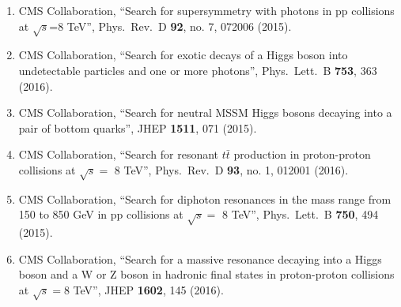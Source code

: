 \begin{enumerate}
\item CMS Collaboration, ``Search for supersymmetry with photons in pp collisions at $\sqrt{s}$=8 TeV'', Phys.\ Rev.\ D {\bf 92}, no. 7, 072006 (2015).

\item CMS Collaboration, ``Search for exotic decays of a Higgs boson into undetectable particles and one or more photons'', Phys.\ Lett.\ B {\bf 753}, 363 (2016).

\item CMS Collaboration, ``Search for neutral MSSM Higgs bosons decaying into a pair of bottom quarks'', JHEP {\bf 1511}, 071 (2015).

\item CMS Collaboration, ``Search for resonant $t \bar t$ production in proton-proton collisions at $\sqrt s=$ 8 TeV'', Phys.\ Rev.\ D {\bf 93}, no. 1, 012001 (2016).

\item CMS Collaboration, ``Search for diphoton resonances in the mass range from 150 to 850 GeV in pp collisions at $\sqrt{s} =$ 8 TeV'', Phys.\ Lett.\ B {\bf 750}, 494 (2015).

\item CMS Collaboration, ``Search for a massive resonance decaying into a Higgs boson and a W or Z boson in hadronic final states in proton-proton collisions at $ \sqrt{s}=8 $ TeV'', JHEP {\bf 1602}, 145 (2016).


\end{enumerate}

